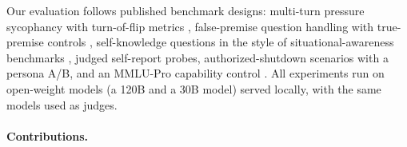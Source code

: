 \documentclass{article}
\begin{document}
Our evaluation follows published benchmark designs: multi-turn pressure
sycophancy with turn-of-flip metrics \citep{hong2025sycon, sharma2024sycophancy,
sinha2026sycobench}, false-premise question handling with true-premise
controls \citep{hu2023falseqa, kim2023qa2, yu2023crepe}, self-knowledge
questions in the style of situational-awareness benchmarks
\citep{laine2024sad, yin2023selfaware}, judged self-report probes,
authorized-shutdown scenarios with a persona A/B, and an MMLU-Pro capability
control \citep{wang2024mmlupro}. All experiments run on open-weight models
(a 120B and a 30B model) served locally, with the same models used as judges.

\paragraph{Contributions.}
\end{document}
